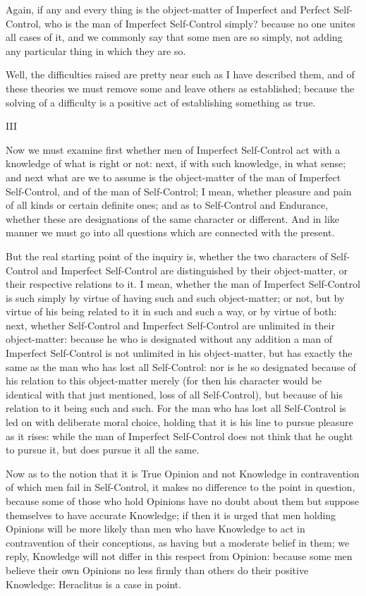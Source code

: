 Again, if any and every thing is the object-matter of Imperfect and
Perfect Self-Control, who is the man of Imperfect Self-Control simply?
because no one unites all cases of it, and we commonly say that some men
are so simply, not adding any particular thing in which they are so.

Well, the difficulties raised are pretty near such as I have described
them, and of these theories we must remove some and leave others as
established; because the solving of a difficulty is a positive act of
establishing something as true.

III

Now we must examine first whether men of Imperfect Self-Control act with
a knowledge of what is right or not: next, if with such knowledge, in
what sense; and next what are we to assume is the object-matter of the
man of Imperfect Self-Control, and of the man of Self-Control; I mean,
whether pleasure and pain of all kinds or certain definite ones; and as
to Self-Control and Endurance, whether these are designations of the
same character or different. And in like manner we must go into all
questions which are connected with the present.

But the real starting point of the inquiry is, whether the two
characters of Self-Control and Imperfect Self-Control are distinguished
by their object-matter, or their respective relations to it. I mean,
whether the man of Imperfect Self-Control is such simply by virtue of
having such and such object-matter; or not, but by virtue of his being
related to it in such and such a way, or by virtue of both: next,
whether Self-Control and Imperfect Self-Control are unlimited in their
object-matter: because he who is designated without any addition a man
of Imperfect Self-Control is not unlimited in his object-matter, but has
exactly the same as the man who has lost all Self-Control: nor is he so
designated because of his relation to this object-matter merely (for
then his character would be identical with that just mentioned, loss
of all Self-Control), but because of his relation to it being such
and such. For the man who has lost all Self-Control is led on with
deliberate moral choice, holding that it is his line to pursue pleasure
as it rises: while the man of Imperfect Self-Control does not think that
he ought to pursue it, but does pursue it all the same.

Now as to the notion that it is True Opinion and not Knowledge in
contravention of which men fail in Self-Control, it makes no difference
to the point in question, because some of those who hold Opinions have
no doubt about them but suppose themselves to have accurate Knowledge;
if then it is urged that men holding Opinions will be more likely than
men who have Knowledge to act in contravention of their conceptions,
as having but a moderate belief in them; we reply, Knowledge will not
differ in this respect from Opinion: because some men believe their
own Opinions no less firmly than others do their positive Knowledge:
Heraclitus is a case in point.

